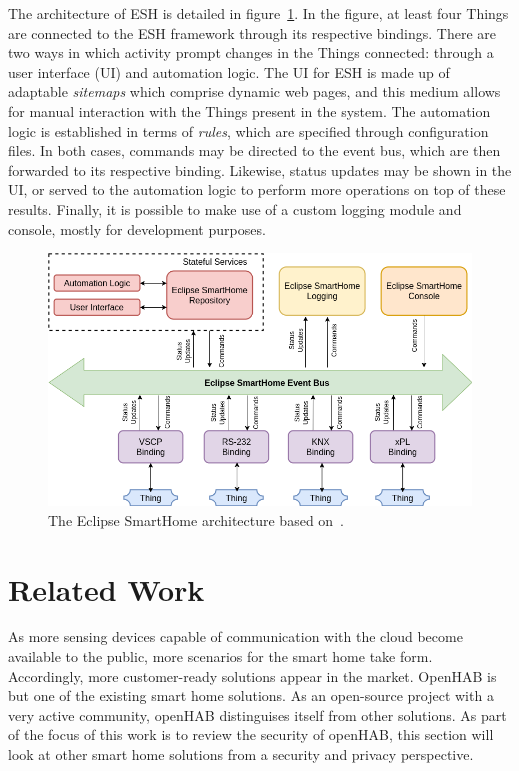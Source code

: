 \documentclass[12pt]{article}
\newcommand{\TODO}{\todo[inline]}
\begin{document}
The architecture of ESH is detailed in figure~\ref{fig:esh_architecture}. In the figure, at least four Things are connected to the ESH framework through its respective bindings. There are two ways in which activity prompt changes in the Things connected: through a user interface (UI) and automation logic. The UI for ESH is made up of adaptable \emph{sitemaps} which comprise dynamic web pages, and this medium allows for manual interaction with the Things present in the system. The automation logic is established in terms of \emph{rules}, which are specified through configuration files. In both cases, commands may be directed to the event bus, which are then forwarded to its respective binding. Likewise, status updates may be shown in the UI, or served to the automation logic to perform more operations on top of these results. Finally, it is possible to make use of a custom logging module and console, mostly for development purposes.

\begin{figure} [ht] 
\begin{center}
\includegraphics[width=\textwidth]{esh_architecture}
\caption{The Eclipse SmartHome architecture based on~\cite{esh_02}.}
\label{fig:esh_architecture}
\end{center}
\end{figure}

\clearpage
\section{Related Work}
\label{sec:related}
\TODO{SUMMARY}
As more sensing devices capable of communication with the cloud become available to the public, more scenarios for the smart home take form. Accordingly, more customer-ready solutions appear in the market. OpenHAB is but one of the existing smart home solutions. As an open-source project with a very active community, openHAB distinguises itself from other solutions. As part of the focus of this work is to review the security of openHAB, this section will look at other smart home solutions from a security and privacy perspective. 
\end{document}
